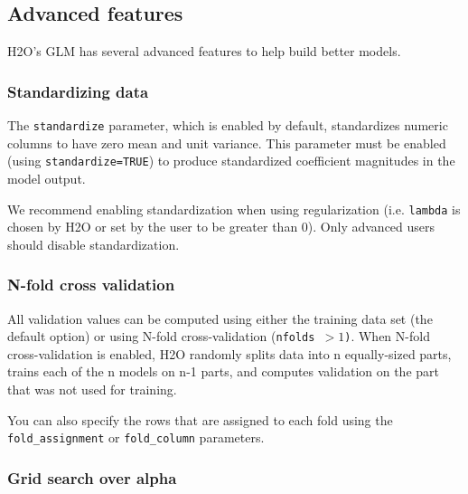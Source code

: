 \bigskip
\waterExampleInR


\waterExampleInPython




\subsection{Advanced features}

H2O's GLM has several advanced features to help build better models.

\subsubsection{Standardizing data}

The \texttt{standardize} parameter, which is enabled by default, standardizes numeric columns to have zero mean and
unit variance.  This parameter must be enabled (using \texttt{standardize=TRUE}) to produce standardized coefficient magnitudes in the model output.

We recommend enabling standardization when using regularization (i.e. \texttt{lambda} is chosen by H2O or set by
the user to be greater than 0). Only advanced users should disable standardization.

\subsubsection{N-fold cross validation}

All validation values can be computed using either the training data set (the default option) or using N-fold
cross-validation (\texttt{nfolds $> 1$)}. When N-fold cross-validation is enabled, H2O randomly splits data into n
equally-sized parts, trains each of the n models on n-1 parts, and computes validation on the part that was not
used for training.

You can also specify the rows that are assigned to each fold using the \texttt{fold\_assignment}
or \texttt{fold\_column} parameters.

\bigskip
\waterExampleInR




\subsubsection{Grid search over alpha}


